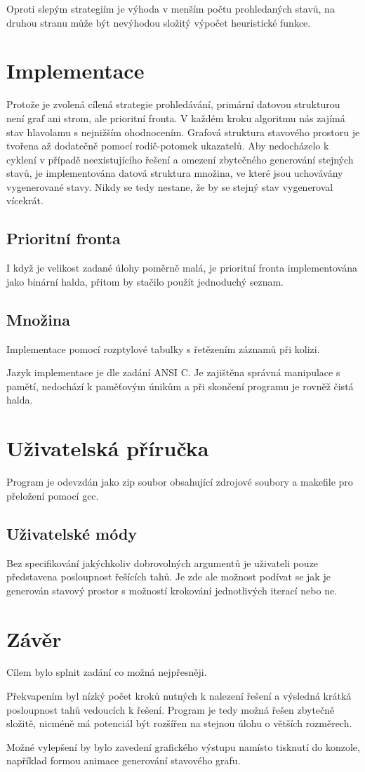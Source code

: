 \documentclass[11pt]{article}
\begin{document}
Oproti slepým strategiím je výhoda v menším počtu prohledaných stavů, na druhou
stranu může být nevýhodou složitý výpočet heuristické funkce.

\section{Implementace}
Protože je zvolená cílená strategie prohledávání, primární datovou strukturou
není graf ani strom, ale prioritní fronta. V každém kroku algoritmu nás zajímá
stav hlavolamu s nejnižším ohodnocením. Grafová struktura stavového prostoru je
tvořena až dodatečně pomocí rodič-potomek ukazatelů. Aby nedocházelo k cyklení
v případě neexistujícího řešení a omezení zbytečného generování stejných stavů,
je implementována datová struktura množina, ve které jsou uchovávány
vygenerované stavy. Nikdy se tedy nestane, že by se stejný stav vygeneroval
vícekrát.

\subsection{Prioritní fronta}
I když je velikost zadané úlohy poměrně malá, je prioritní fronta
implementována jako binární halda, přitom by stačilo použít jednoduchý seznam.

\subsection{Množina}
Implementace pomocí rozptylové tabulky s řetězením záznamů při kolizi.

Jazyk implementace je dle zadání ANSI C. Je zajištěna správná manipulace s
pamětí, nedochází k paměťovým únikům a při skončení programu je rovněž čistá
halda.


\section{Uživatelská příručka}
Program je odevzdán jako zip soubor obsahující zdrojové soubory a makefile pro
přeložení pomocí gcc.

\subsection{Uživatelské módy}
Bez specifikování jakýchkoliv dobrovolných argumentů je uživateli pouze
představena posloupnost řešících tahů. Je zde ale možnost podívat se jak je
generován stavový prostor s možností krokování jednotlivých iterací nebo ne.


\section{Závěr}
Cílem bylo splnit zadání co možná nejpřesněji. 

Překvapením byl nízký počet kroků nutných k nalezení řešení a výsledná krátká
posloupnost tahů vedoucích k řešení. Program je tedy možná řešen zbytečně
složitě, nicméně má potenciál být rozšířen na stejnou úlohu o větších
rozměrech.

Možné vylepšení by bylo zavedení grafického výstupu namísto tisknutí do konzole,
například formou animace generování stavového grafu.
\end{document}
